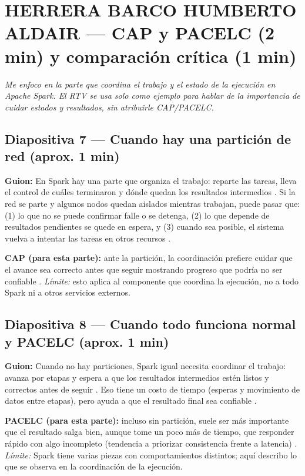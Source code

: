 \section*{HERRERA BARCO HUMBERTO ALDAIR — CAP y PACELC (2 min) y comparación crítica (1 min)}
\textit{Me enfoco en la parte que coordina el trabajo y el estado de la ejecución en Apache Spark. El RTV se usa solo como ejemplo para hablar de la importancia de cuidar estados y resultados, sin atribuirle CAP/PACELC.}

\subsection*{Diapositiva 7 --- Cuando hay una partición de red (aprox. 1 min)}
\textbf{Guion:} En Spark hay una parte que organiza el trabajo: reparte las tareas, lleva el control de cuáles terminaron y dónde quedan los resultados intermedios \cite{elhmadany2024,vandongen2021}. Si la red se parte y algunos nodos quedan aislados mientras trabajan, puede pasar que: (1) lo que no se puede confirmar falle o se detenga, (2) lo que depende de resultados pendientes se quede en espera, y (3) cuando sea posible, el sistema vuelva a intentar las tareas en otros recursos \cite{vandongen2021,javed2023}. 

\textbf{CAP (para esta parte):} ante la partición, la coordinación prefiere cuidar que el avance sea correcto antes que seguir mostrando progreso que podría no ser confiable \cite{vandongen2021,javed2023}. \textit{Límite:} esto aplica al componente que coordina la ejecución, no a todo Spark ni a otros servicios externos.

\subsection*{Diapositiva 8 --- Cuando todo funciona normal y PACELC (aprox. 1 min)}
\textbf{Guion:} Cuando no hay particiones, Spark igual necesita coordinar el trabajo: avanza por etapas y espera a que los resultados intermedios estén listos y correctos antes de seguir \cite{elhmadany2024,vandongen2021}. Eso tiene un costo de tiempo (esperas y movimiento de datos entre etapas), pero ayuda a que el resultado final sea confiable \cite{mostafaei2022,elhmadany2024}. 

\textbf{PACELC (para esta parte):} incluso sin partición, suele ser más importante que el resultado salga bien, aunque tome un poco más de tiempo, que responder rápido con algo incompleto (tendencia a priorizar consistencia frente a latencia) \cite{vandongen2021,javed2023}. \textit{Límite:} Spark tiene varias piezas con comportamientos distintos; aquí describo lo que se observa en la coordinación de la ejecución.

